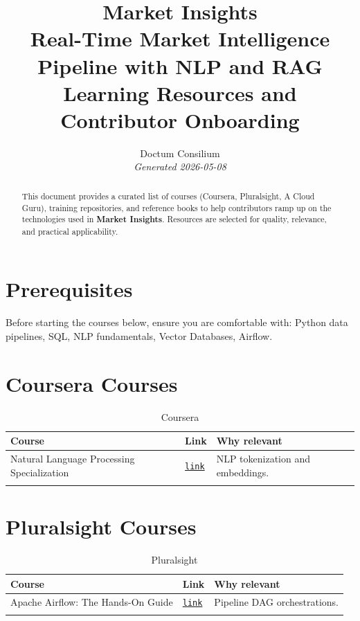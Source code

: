 \documentclass[11pt,a4paper]{article}
\begin{document}
\title{
  \textcolor{doctum}{\Large\textbf{Market Insights}} \\[0.5em]
  \large Real-Time Market Intelligence Pipeline with NLP and RAG \\[0.3em]
  \normalsize Learning Resources and Contributor Onboarding
}
\author{Doctum Consilium \\ \small\textit{Generated 2026-05-08}}
\date{}
\maketitle
\thispagestyle{fancy}

\begin{abstract}
This document provides a curated list of courses (Coursera, Pluralsight, A Cloud Guru),
training repositories, and reference books to help contributors ramp up on the
technologies used in \textbf{Market Insights}.
Resources are selected for quality, relevance, and practical applicability.
\end{abstract}

\tableofcontents
\newpage

\section{Prerequisites}
Before starting the courses below, ensure you are comfortable with:
Python data pipelines, SQL, NLP fundamentals, Vector Databases, Airflow.

\section{Coursera Courses}
\begin{longtable}{p{6cm} p{1.5cm} p{7cm}}
\toprule
\textbf{Course} & \textbf{Link} & \textbf{Why relevant} \\
\midrule
\endhead
  Natural Language Processing Specialization & \href{https://www.coursera.org/specializations/natural-language-processing}{\texttt{link}} & NLP tokenization and embeddings. \\
\bottomrule
\caption{Coursera}
\end{longtable}


\section{Pluralsight Courses}
\begin{longtable}{p{6cm} p{1.5cm} p{7cm}}
\toprule
\textbf{Course} & \textbf{Link} & \textbf{Why relevant} \\
\midrule
\endhead
  Apache Airflow: The Hands-On Guide & \href{https://www.pluralsight.com/courses/apache-airflow-hands-on}{\texttt{link}} & Pipeline DAG orchestrations. \\
\bottomrule
\caption{Pluralsight}
\end{longtable}
\end{document}
